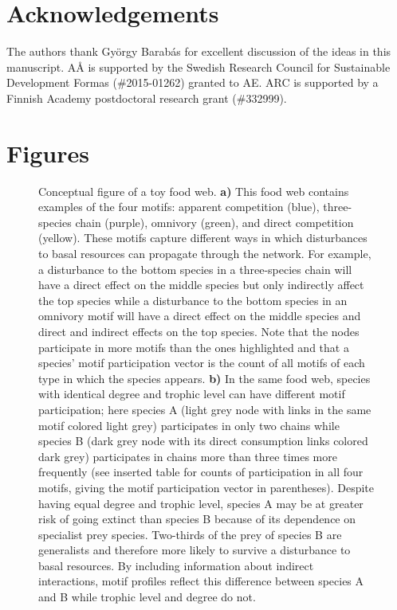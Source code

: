 \documentclass[12pt]{article}
\begin{document}
\begin{spacing}{2.0}
\section*{Acknowledgements}

    The authors thank Gy\"{o}rgy Barab\'{a}s for excellent discussion of the ideas in this manuscript. A{\AA} is supported by the Swedish Research Council for Sustainable Development Formas (\#2015-01262) granted to AE. ARC is supported by a Finnish Academy postdoctoral research grant (\#332999).

\clearpage    

\section*{Figures}
    

        \begin{figure}[hb!]
        \centering
        \caption{Conceptual figure of a toy food web. \textbf{a)} This food web contains examples of the four motifs: apparent competition (blue), three-species chain (purple), omnivory (green), and direct competition (yellow). These motifs capture different ways in which disturbances to basal resources can propagate through the network. For example, a disturbance to the bottom species in a three-species chain will have a direct effect on the middle species but only indirectly affect the top species while a disturbance to the bottom species in an omnivory motif will have a direct effect on the middle species and direct and indirect effects on the top species. 
        Note that the nodes participate in more motifs than the ones highlighted and that a species' motif participation vector is the count of all motifs of each type in which the species appears. \textbf{b)} In the same food web, species with identical degree and trophic level can have different motif participation; here species A (light grey node with links in the same motif colored light grey) participates in only two chains while species B (dark grey node with its direct consumption links colored dark grey) participates in chains more than three times more frequently (see inserted table for counts of participation in all four motifs, giving the motif participation vector in parentheses). 
        Despite having equal degree and trophic level, species A may be at greater risk of going extinct than species B because of its dependence on specialist prey species. Two-thirds of the prey of species B are generalists and therefore more likely to survive a disturbance to basal resources. By including information about indirect interactions, motif profiles reflect this difference between species A and B while trophic level and degree do not.}
    \label{fig:concept}
    \end{figure}



\end{spacing}
\end{document}

